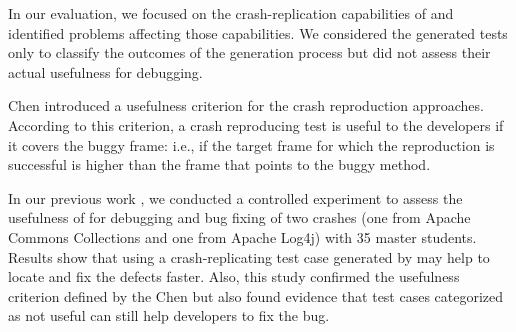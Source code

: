 In our evaluation, we focused on the crash-replication capabilities of \evocrash and identified problems affecting those capabilities. 
We considered the generated tests only to classify the outcomes of the \evocrash generation process but did not assess their actual usefulness for debugging. 

Chen \etal \cite{Chen2015} introduced a usefulness criterion for the crash reproduction approaches. 
According to this criterion, a crash reproducing test is useful to the developers if it covers the buggy frame: i.e., if the target frame for which the reproduction is successful is higher than the frame that points to the buggy method.

In our previous work \cite{Soltani2018a}, we conducted a controlled experiment to assess the usefulness of \evocrash for debugging and bug fixing of two crashes (one from Apache Commons Collections and one from Apache Log4j) with 35 master students. Results show that using a crash-replicating test case generated by \evocrash may help to locate and fix the defects faster. Also, this study confirmed the usefulness criterion defined by the Chen \etal \cite{Chen2015} but also found evidence that test cases categorized as not useful can still help developers to fix the bug. 


